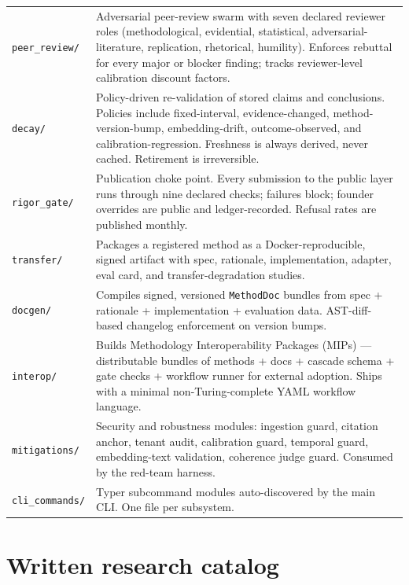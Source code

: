 \documentclass[11pt,letterpaper]{article}
\newcommand{\file}[1]{\texttt{#1}}
\begin{document}
\begin{longtable}{p{2.6cm} p{12cm}}
\file{peer\_review/}  & Adversarial peer-review swarm with seven declared reviewer roles (methodological, evidential, statistical, adversarial-literature, replication, rhetorical, humility). Enforces rebuttal for every major or blocker finding; tracks reviewer-level calibration discount factors. \\
\file{decay/}         & Policy-driven re-validation of stored claims and conclusions. Policies include fixed-interval, evidence-changed, method-version-bump, embedding-drift, outcome-observed, and calibration-regression. Freshness is always derived, never cached. Retirement is irreversible. \\
\file{rigor\_gate/}   & Publication choke point. Every submission to the public layer runs through nine declared checks; failures block; founder overrides are public and ledger-recorded. Refusal rates are published monthly. \\
\file{transfer/}      & Packages a registered method as a Docker-reproducible, signed artifact with spec, rationale, implementation, adapter, eval card, and transfer-degradation studies. \\
\file{docgen/}        & Compiles signed, versioned \texttt{MethodDoc} bundles from spec + rationale + implementation + evaluation data. AST-diff-based changelog enforcement on version bumps. \\
\file{interop/}       & Builds Methodology Interoperability Packages (MIPs) --- distributable bundles of methods + docs + cascade schema + gate checks + workflow runner for external adoption. Ships with a minimal non-Turing-complete YAML workflow language. \\
\file{mitigations/}   & Security and robustness modules: ingestion guard, citation anchor, tenant audit, calibration guard, temporal guard, embedding-text validation, coherence judge guard. Consumed by the red-team harness. \\
\file{cli\_commands/} & Typer subcommand modules auto-discovered by the main CLI. One file per subsystem. \\
\bottomrule
\end{longtable}

\newpage
\section{Written research catalog}
\end{document}
